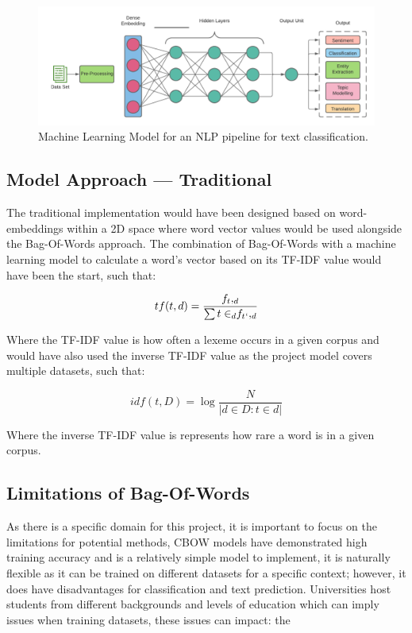 \begin{figure}[H]
    \centering
    \includegraphics[width=\textwidth]{figures/chapter-5/MLNLP.pdf}
    \caption[MachineLearningNLP]{Machine Learning Model for an NLP pipeline for text classification.
    \label{fig:MLNLP}}
\end{figure}

\subsection{Model Approach --- Traditional}

The traditional implementation would have been designed based on word-embeddings within a 2D space where word vector values would be used alongside the Bag-Of-Words approach. The combination of Bag-Of-Words with a machine learning model to calculate a word’s vector based on its TF-IDF value would have been the start, such that:

\begin{equation}
    tf(t,d) = \frac{f_t, _d}{\sum{t \in_d} f _t {_`}, _d}
\end{equation}

Where the TF-IDF value is how often a lexeme occurs in a given corpus and would have also used the inverse TF-IDF value as the project model covers multiple datasets, such that:

\begin{equation}
    idf(t, D) = \log \frac{N}{|d \in D : t \in d|}
\end{equation}

Where the inverse TF-IDF value is represents how rare a word is in a given corpus.

\subsection{Limitations of Bag-Of-Words}

As there is a specific domain for this project, it is important to focus on the limitations for potential methods, CBOW models have demonstrated high training accuracy and is a relatively simple model to implement, it is naturally flexible as it can be trained on different datasets for a specific context; however, it does have disadvantages for classification and text prediction. Universities host students from different backgrounds and levels of education which can imply issues when training datasets, these issues can impact: the

